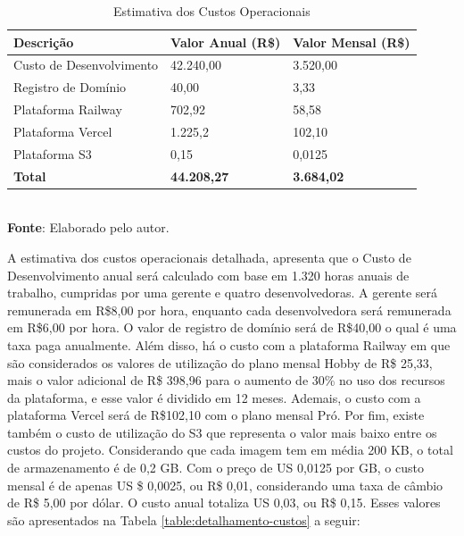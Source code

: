 \begin{table}[h!]
\centering
\caption{Estimativa dos Custos Operacionais}
\begin{tabular}{|m{5cm}|m{4cm}|m{4cm}|}
\hline
\textbf{Descrição}   & \textbf{Valor Anual (R\$)} & \textbf{Valor Mensal (R\$)} \\
\hline
Custo de Desenvolvimento & 42.240,00 & 3.520,00 \\
\hline
Registro de Domínio & 40,00 & 3,33 \\
\hline
Plataforma Railway & 702,92 & 58,58 \\
\hline
Plataforma Vercel & 1.225,2  & 102,10 \\
\hline
Plataforma S3 & 0,15 & 0,0125   \\
\hline
\textbf{Total} & \textbf{44.208,27} & \textbf{3.684,02} \\
\hline
\end{tabular}
\label{table:estimativa-custos}
\\[1ex]
\footnotesize \textbf{Fonte}: Elaborado pelo autor.
\end{table}

A estimativa dos custos operacionais detalhada, apresenta que o Custo de Desenvolvimento anual será calculado com base em 1.320 horas anuais de trabalho, cumpridas por uma gerente e quatro desenvolvedoras. A gerente será remunerada em R\$8,00 por hora, enquanto cada desenvolvedora será remunerada em R\$6,00 por hora. O valor de registro de domínio será de R\$40,00 o qual é uma taxa paga anualmente. Além disso, há o custo com a plataforma Railway em que são considerados os valores de utilização do plano mensal Hobby de R\$ 25,33, mais o valor adicional de R\$ 398,96 para o aumento de 30\% no uso dos recursos da plataforma, e esse valor é dividido em 12 meses. Ademais,  o custo com a plataforma Vercel será de R\$102,10 com o plano mensal Pró. Por fim, existe também o custo de utilização do S3 que representa o valor mais baixo entre os custos do projeto. Considerando que cada imagem tem em média 200 KB, o total de armazenamento é de 0,2 GB. Com o preço de US 0,0125 por GB, o custo mensal é de apenas US \$ 0,0025, ou R\$ 0,01, considerando uma taxa de câmbio de R\$ 5,00 por dólar. O custo anual totaliza US 0,03, ou R\$ 0,15. Esses valores são apresentados  na Tabela \ref{table:detalhamento-custos} a seguir:

